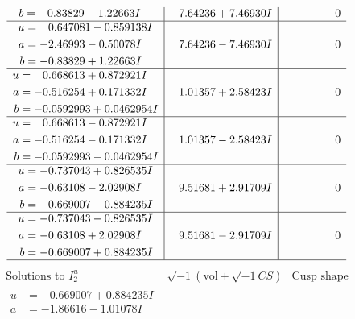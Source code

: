 \documentclass[1p]{elsarticle_modified}
\theoremstyle{definition}
\newcommand{\I}{\sqrt{-1}}
\begin{document}
$$\begin{array}{c|c|c}
\begin{aligned}
b &= -0.83829 - 1.22663 I\end{aligned}
 & \phantom{-}7.64236 + 7.46930 I & \phantom{-0.000000 } 0 \\ \hline\begin{aligned}
u &= \phantom{-}0.647081 - 0.859138 I \\
a &= -2.46993 - 0.50078 I \\
b &= -0.83829 + 1.22663 I\end{aligned}
 & \phantom{-}7.64236 - 7.46930 I & \phantom{-0.000000 } 0 \\ \hline\begin{aligned}
u &= \phantom{-}0.668613 + 0.872921 I \\
a &= -0.516254 + 0.171332 I \\
b &= -0.0592993 + 0.0462954 I\end{aligned}
 & \phantom{-}1.01357 + 2.58423 I & \phantom{-0.000000 } 0 \\ \hline\begin{aligned}
u &= \phantom{-}0.668613 - 0.872921 I \\
a &= -0.516254 - 0.171332 I \\
b &= -0.0592993 - 0.0462954 I\end{aligned}
 & \phantom{-}1.01357 - 2.58423 I & \phantom{-0.000000 } 0 \\ \hline\begin{aligned}
u &= -0.737043 + 0.826535 I \\
a &= -0.63108 - 2.02908 I \\
b &= -0.669007 - 0.884235 I\end{aligned}
 & \phantom{-}9.51681 + 2.91709 I & \phantom{-0.000000 } 0 \\ \hline\begin{aligned}
u &= -0.737043 - 0.826535 I \\
a &= -0.63108 + 2.02908 I \\
b &= -0.669007 + 0.884235 I\end{aligned}
 & \phantom{-}9.51681 - 2.91709 I & \phantom{-0.000000 } 0\\
 \hline 
 \end{array}$$\newpage$$\begin{array}{c|c|c}  
\text{Solutions to }I^u_{2}& \I (\text{vol} + \sqrt{-1}CS) & \text{Cusp shape}\\
 \hline 
\begin{aligned}
u &= -0.669007 + 0.884235 I \\
a &= -1.86616 - 1.01078 I \\

\end{aligned}
\end{array}$$
\end{document}
